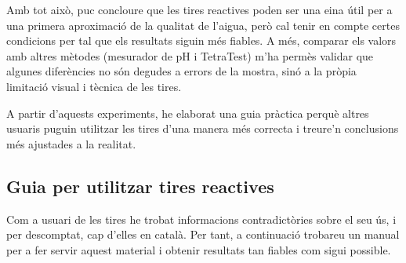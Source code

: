 Amb tot això, puc concloure que les tires reactives poden ser una eina útil per a una primera aproximació de la qualitat de l’aigua, però cal tenir en compte certes condicions per tal que els resultats siguin més fiables. A més, comparar els valors amb altres mètodes (mesurador de pH i TetraTest) m’ha permès validar que algunes diferències no són degudes a errors de la mostra, sinó a la pròpia limitació visual i tècnica de les tires.

A partir d’aquests experiments, he elaborat una guia pràctica perquè altres usuaris puguin utilitzar les tires d’una manera més correcta i treure’n conclusions més ajustades a la realitat.

\subsection{Guia per utilitzar tires reactives}

Com a usuari de les tires he trobat informacions contradictòries sobre el seu ús, i per descomptat, cap d'elles en català. Per tant, a continuació trobareu un manual per a fer servir aquest material i obtenir resultats tan fiables com sigui possible.


